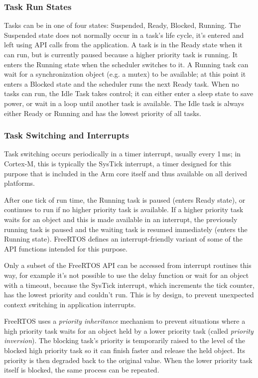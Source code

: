 \subsubsection{Task Run States}

Tasks can be in one of four states: Suspended, Ready, Blocked, Running. The Suspended state does not normally occur in a task's life cycle, it's entered and left using API calls from the application. A task is in the Ready state when it can run, but is currently paused because a higher priority task is running. It enters the Running state when the scheduler switches to it. A Running task can wait for a synchronization object (e.g. a mutex) to be available; at this point it enters a Blocked state and the scheduler runs the next Ready task. When no tasks can run, the Idle Task takes control; it can either enter a sleep state to save power, or wait in a loop until another task is available. The Idle task is always either Ready or Running and has the lowest priority of all tasks.

\subsubsection{Task Switching and Interrupts}

Task switching occurs periodically in a timer interrupt, usually every 1\,ms; in Cortex-M, this is typically the SysTick interrupt, a timer designed for this purpose that is included in the Arm core itself and thus available on all derived platforms.

After one tick of run time, the Running task is paused (enters Ready state), or continues to run if no higher priority task is available. If a higher priority task waits for an object and this is made available in an interrupt, the previously running task is paused and the waiting task is resumed immediately (enters the Running state). FreeRTOS defines an interrupt-friendly variant of some of the \gls{API} functions intended for this purpose. 

Only a subset of the FreeRTOS \gls{API} can be accessed from interrupt routines this way, for example it's not possible to use the delay function or wait for an object with a timeout, because the SysTick interrupt, which increments the tick counter, has the lowest priority and couldn't run. This is by design, to prevent unexpected context switching in application interrupts.

FreeRTOS uses a \textit{priority inheritance} mechanism to prevent situations where a high priority task waits for an object held by a lower priority task (called \textit{priority inversion}). The blocking task's priority is temporarily raised to the level of the blocked high priority task so it can finish faster and release the held object. Its priority is then degraded back to the original value. When the lower priority task itself is blocked, the same process can be repeated.

